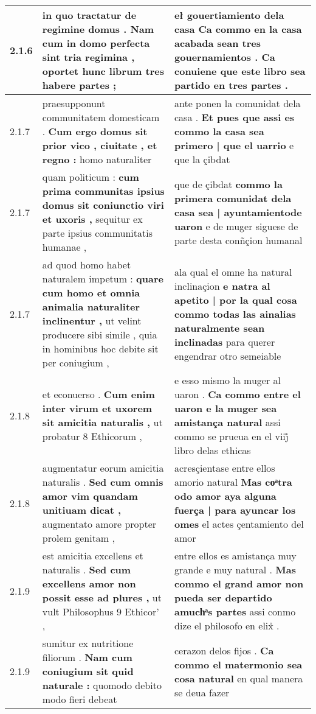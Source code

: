 \begin{tabular}{|p{1cm}|p{6.5cm}|p{6.5cm}|}
2.1.6 & in quo tractatur de regimine domus . \textbf{ Nam cum in domo perfecta sint tria regimina , } oportet hunc librum tres habere partes ; & eł gouertiamiento dela casa \textbf{ Ca commo en la casa acabada sean tres gouernamientos . } Ca conuiene que este libro sea partido en tres partes . \\\hline
2.1.7 & praesupponunt communitatem domesticam . \textbf{ Cum ergo domus sit prior vico , ciuitate , et regno : } homo naturaliter & ante ponen la comunidat dela casa . \textbf{ Et pues que assi es commo la casa sea primero | que el uarrio } e que la çibdat \\\hline
2.1.7 & quam politicum : \textbf{ cum prima communitas ipsius domus sit coniunctio viri et uxoris , } sequitur ex parte ipsius communitatis humanae , & que de çibdat \textbf{ commo la primera comunidat dela casa sea | ayuntamientode uaron } e de muger siguese de parte desta conñçion humanal \\\hline
2.1.7 & ad quod homo habet naturalem impetum : \textbf{ quare cum homo et omnia animalia naturaliter inclinentur , } ut velint producere sibi simile , quia in hominibus hoc debite sit per coniugium , & ala qual el omne ha natural inclinaçion \textbf{ e natra al apetito | por la qual cosa commo todas las ainalias naturalmente sean inclinadas } para querer engendrar otro semeiable \\\hline
2.1.8 & et econuerso . \textbf{ Cum enim inter virum et uxorem sit amicitia naturalis , } ut probatur 8 Ethicorum , & e esso mismo la muger al uaron . \textbf{ Ca commo entre el uaron e la muger sea amistança natural } assi commo se prueua en el viij̊ libro delas ethicas \\\hline
2.1.8 & augmentatur eorum amicitia naturalis . \textbf{ Sed cum omnis amor vim quandam unitiuam dicat , } augmentato amore propter prolem genitam , & acresçientase entre ellos amorio natural \textbf{ Mas coͣtra odo amor aya alguna fuerça | para ayuncar los omes } el actes çentamiento del amor \\\hline
2.1.9 & est amicitia excellens et naturalis . \textbf{ Sed cum excellens amor non possit esse ad plures , } ut vult Philosophus 9 Ethicor’ , & entre ellos es amistança muy grande e muy natural . \textbf{ Mas commo el grand amor non pueda ser departido amuchͣs partes } assi conmo dize el philosofo en elix̊ . \\\hline
2.1.9 & sumitur ex nutritione filiorum . \textbf{ Nam cum coniugium sit quid naturale : } quomodo debito modo fieri debeat & cerazon delos fijos . \textbf{ Ca commo el matermonio sea cosa natural } en qual manera se deua fazer \\\hline

\end{tabular}
